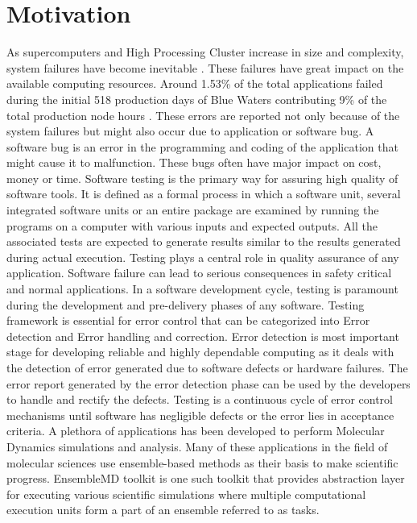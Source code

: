 \documentclass[10pt]{ruthesis}
\begin{document}
\section{Motivation}
 As supercomputers and High Processing Cluster increase in size and complexity, system failures have become inevitable \cite{ref7}. These failures have great impact on the available computing resources. Around 1.53\% of the total applications failed during the initial 518 production days of Blue Waters contributing 9\% of the total production node hours \cite{ref6}. These errors are reported not only because of the system failures but might also occur due to application or software bug. A software bug is an error in the programming and coding of the application that might cause it to malfunction. These bugs often have major impact on cost, money or time. Software testing is the primary way for assuring high quality of software tools. It is defined as a formal process in which a software unit, several integrated software units or an entire package are examined by running the programs on a computer with various inputs and expected outputs. All the associated tests are expected to generate results similar to the results generated during actual execution. Testing plays a central role in quality assurance of any application. Software failure can lead to serious consequences in safety critical and normal applications. In a software development cycle, testing is paramount during the development and pre-delivery phases of any software. Testing framework is essential for error control that can be categorized into Error detection and Error handling and correction. Error detection is most important stage for developing reliable and highly dependable computing as it deals with the detection of error generated due to software defects or hardware failures. The error report generated by the error detection phase can be used by the developers to handle and rectify the defects. Testing is a continuous cycle of error control mechanisms until software has negligible defects or the error lies in acceptance criteria. A plethora of applications has been developed to perform Molecular Dynamics simulations and analysis. Many of these applications in the field of molecular sciences use ensemble-based methods as their basis to make scientific progress. EnsembleMD toolkit is one such toolkit that provides abstraction layer for executing various scientific simulations where multiple computational execution units form a part of an ensemble referred to as tasks. 
\end{document}
